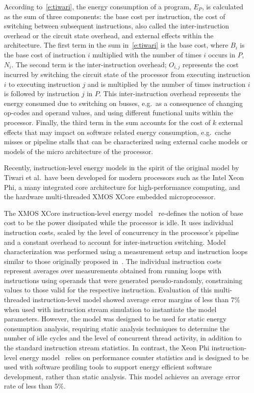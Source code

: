 According to~\ref{e:tiwari}, the energy consumption of a program, $E_P$, is calculated as the sum of three components: the base cost per instruction, the cost of switching between subsequent instructions, also called the inter-instruction overhead or the circuit state overhead, and external effects within the architecture.
%
The first term in the sum in~\ref{e:tiwari} is the base cost, where $B_i$ is the base cost of instruction $i$ multiplied with the number of times $i$ occurs in $P$, $N_i$.
%
The second term is the inter-instruction overhead; $O_{i,j}$ represents the cost incurred by switching the circuit state of the processor from executing instruction $i$ to executing instruction $j$ and is multiplied by the number of times instruction $i$ is followed by instruction $j$ in $P$. This inter-instruction overhead represents the energy consumed due to switching on busses, e.g.\ as a consequence of changing op-codes and operand values, and using different functional units within the processor. 
%
Finally, the third term in the sum accounts for the cost of $k$ external effects that may impact on software related energy consumption, e.g.\ cache misses or pipeline stalls that can be characterized using external cache models or models of the micro architecture of the processor. 

Recently, instruction-level energy models in the spirit of the original model by Tiwari et al.\ have been developed for modern processors such as the Intel Xeon Phi, a many integrated core architecture for high-performance computing, and the hardware multi-threaded XMOS XCore embedded microprocessor.

The XMOS XCore instruction-level energy
model~\cite{DBLP:journals/tecs/KerrisonE15} re-defines the notion of base cost
to be the power dissipated while the processor is idle. It uses individual
instruction costs, scaled by the level of concurrency in the processor's
pipeline and a constant overhead to account for inter-instruction switching.
%
Model characterization was performed using a measurement setup and instruction
loops similar to those originally proposed in~\cite{Tiwari-embedded-1994}. The
individual instruction costs represent averages over measurements obtained from
running loops with instructions using operands that were generated
pseudo-randomly, constraining values to those valid for the respective
instruction.
%
Evaluation of this multi-threaded instruction-level model showed average error
margins of less than 7\% when used with instruction stream simulation to
instantiate the model parameters.
%
However, the model was designed to be used for static energy consumption analysis,
requiring static analysis techniques to determine the number of idle cycles and
the level of concurrent thread activity, in addition to the standard
instruction stream statistics.
% 
In contrast, the Xeon Phi instruction-level energy model~\cite{phimodel} relies
on performance counter statistics and is designed to be used with software
profiling tools to support energy efficient software development, rather than
static analysis. This model achieves an average error rate of less than 5\%.




